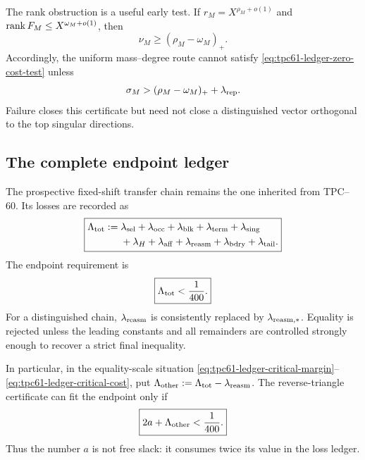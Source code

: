 The rank obstruction is a useful early test.  If
\(r_M=X^{\rho_M+o(1)}\) and
\(\operatorname{rank} F_M\le X^{\omega_M+o(1)}\), then
\begin{equation}
 \nu_M\ge(\rho_M-\omega_M)_+.
 \label{eq:tpc61-ledger-rank-floor}
\end{equation}
Accordingly, the uniform mass--degree route cannot satisfy
\eqref{eq:tpc61-ledger-zero-cost-test} unless
\begin{equation}
 \sigma_M>(\rho_M-\omega_M)_++\lambda_{\rm rep}.
 \label{eq:tpc61-ledger-rank-necessary}
\end{equation}
Failure closes this certificate but need not close a distinguished vector
orthogonal to the top singular directions.

\subsection{The complete endpoint ledger}

The prospective fixed-shift transfer chain remains the one inherited from
TPC--60.  Its losses are recorded as
\begin{equation}
 \boxed{
 \begin{aligned}
 \Lambda_{\rm tot}:={}&
 \lambda_{\rm sel}+\lambda_{\rm occ}
 +\lambda_{\rm blk}+\lambda_{\rm term}
 +\lambda_{\rm sing}\\
 &+\lambda_H+\lambda_{\rm aff}
 +\lambda_{\rm reasm}
 +\lambda_{\rm bdry}+\lambda_{\rm tail}.
 \end{aligned}}
 \label{eq:tpc61-complete-endpoint-ledger}
\end{equation}
The endpoint requirement is
\begin{equation}
 \boxed{\Lambda_{\rm tot}<\frac1{400}.}
 \label{eq:tpc61-strict-endpoint-budget}
\end{equation}
For a distinguished chain, \(\lambda_{\rm reasm}\) is consistently
replaced by \(\lambda_{\rm reasm,*}\).  Equality is rejected unless the
leading constants and all remainders are controlled strongly enough to
recover a strict final inequality.

In particular, in the equality-scale situation
\eqref{eq:tpc61-ledger-critical-margin}--%
\eqref{eq:tpc61-ledger-critical-cost}, put
\(\Lambda_{\rm other}:=\Lambda_{\rm tot}-\lambda_{\rm reasm}\).  The
reverse-triangle certificate can fit the endpoint only if
\begin{equation}
 \boxed{
  2a+\Lambda_{\rm other}<\frac1{400}.}
 \label{eq:tpc61-equality-margin-endpoint-test}
\end{equation}
Thus the number \(a\) is not free slack: it consumes twice its value in
the loss ledger.

